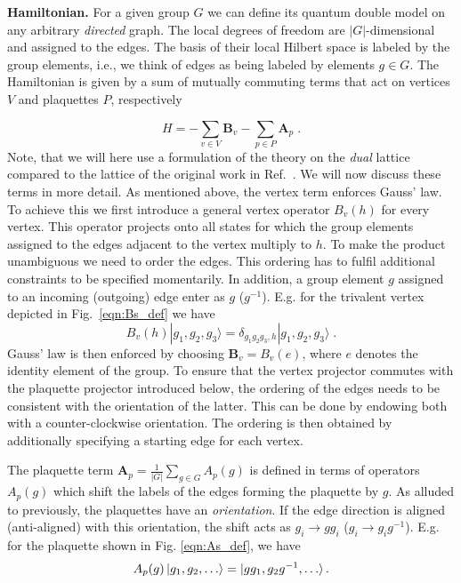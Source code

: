 \documentclass[two column]{article}
\begin{document}
\textbf{Hamiltonian.}
For a given group $G$ we can define its quantum double model on any arbitrary \emph{directed} graph. The local degrees of freedom are $|G|$-dimensional and assigned to the edges. The basis of their local Hilbert space is labeled by the group elements, i.e., we think of edges as being labeled by elements $g\in G$. The Hamiltonian is given by a sum of mutually commuting terms that act on vertices $V$ and plaquettes $P$, respectively




\begin{equation}
    H = -  \sum_{v \in V} \mathbf B_v -  \sum_{p  \in  P} \mathbf A_p \label{eqn:ham} \;.
\end{equation}
Note, that we will here use a formulation of the theory on the \emph{dual} lattice compared to the lattice of the original work in Ref.~\cite{Kitaev_2003}.
We will now discuss these terms in more detail. As mentioned above, the vertex term enforces Gauss' law. To achieve this we first introduce a general vertex operator $B_v{(h)}$ for every vertex. This operator projects onto all states for which the group elements assigned to the edges adjacent to the vertex multiply to $h$. To make the product unambiguous we need to order the edges. This ordering has to fulfil additional constraints to be specified momentarily. In addition, a group element $g$ assigned to an incoming (outgoing) edge enter as $g$ ($g^{-1}$). E.g. for the trivalent vertex depicted in Fig.~\ref{eqn:Bs_def} we have 
\begin{equation}
B_v{(h)} |g_1,g_2,g_3\rangle= \delta_{g_1 g_2 g_3,h} |g_1,g_2,g_3\rangle \;.	
\end{equation}
Gauss' law is then enforced by choosing $\mathbf B_v=B_v{(e)}$, where $e$ denotes the identity element of the group. To ensure that the vertex projector commutes with the plaquette projector introduced below, the ordering of the edges needs to be consistent with the orientation of the latter. This can be done by endowing both with a counter-clockwise orientation. The ordering is then obtained by additionally specifying a starting edge for each vertex.

The plaquette term 
	$\mathbf A_p=\frac{1}{|G|} \sum_{g \in G} A_p{(g)}$
is defined in terms of operators $A_p{(g)}$ which shift the labels of the edges forming the plaquette by $g$. As alluded to previously, the plaquettes have an \emph{orientation}. If the edge direction is aligned (anti-aligned) with this orientation, the shift acts as $g_i \rightarrow gg_i$ ($g_i \rightarrow g_ig^{-1}$). E.g. for the plaquette shown in Fig. \ref{eqn:As_def}, we have 
\begin{equation}
	A_p{(g)}\ket{g_1, g_2, \ldots} = \ket{gg_1, g_2g^{-1}, \ldots}.
\end{equation} 
\end{document}
